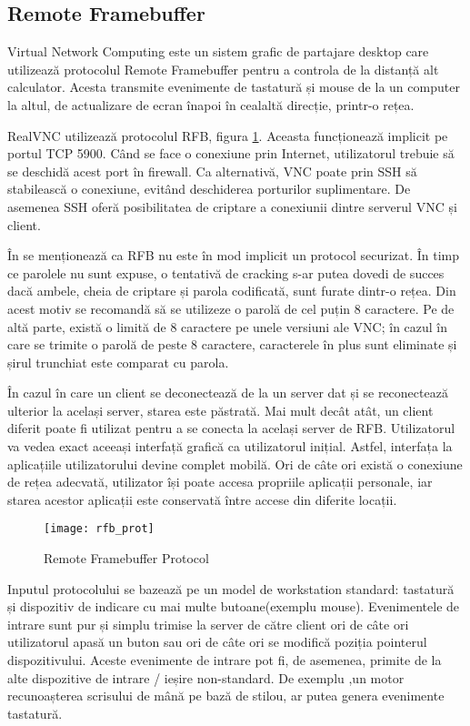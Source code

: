 \subsection{Remote Framebuffer}

Virtual Network Computing este un sistem grafic de partajare desktop care utilizează protocolul Remote Framebuffer pentru a controla de la distanță alt calculator. Acesta transmite  evenimente de tastatură și mouse de la un computer la altul, de actualizare de ecran înapoi în cealaltă direcție, printr-o rețea. 

RealVNC utilizează protocolul RFB, figura \ref{rfb-protocol}. Aceasta funcționează implicit pe portul TCP 5900. Când se face o conexiune prin Internet, utilizatorul trebuie să se deschidă acest port în firewall. Ca alternativă, VNC poate prin SSH  să stabilească o conexiune, evitând deschiderea porturilor suplimentare. De asemenea SSH oferă  posibilitatea de criptare a conexiunii dintre serverul VNC și client.

În \cite{wiki:vnc} se menționează ca RFB nu este în mod implicit un protocol securizat. În timp ce parolele nu sunt expuse, o tentativă de cracking s-ar putea dovedi de succes dacă ambele, cheia de criptare și parola codificată, sunt furate dintr-o rețea. Din acest motiv se recomandă să se utilizeze o parolă de cel puțin 8 caractere. Pe de altă parte, există o limită de 8 caractere pe unele versiuni ale VNC; în cazul în care se trimite o parolă de peste 8 caractere, caracterele în plus sunt eliminate și șirul trunchiat este comparat cu parola.

În cazul în care un client se deconectează de la un server dat și se reconectează ulterior la același server, starea este păstrată. Mai mult decât atât, un client diferit poate fi utilizat pentru a se conecta la același
server de RFB. Utilizatorul va vedea exact aceeași interfață grafică ca utilizatorul inițial. Astfel, interfața la aplicațiile utilizatorului devine complet mobilă. Ori de câte ori există o conexiune de rețea adecvată, utilizator își poate accesa propriile aplicații personale, iar starea acestor aplicații este
conservată între accese din diferite locații. 

\begin{figure}
    \centering
    \texttt{[image: rfb\_prot]}
    \caption{Remote Framebuffer Protocol}
    \label{rfb-protocol}
\end{figure}

Inputul protocolului se bazează pe un model de workstation standard: tastatură
și dispozitiv de indicare cu mai multe butoane(exemplu mouse). Evenimentele de intrare sunt pur și simplu trimise la server de către client ori de câte ori utilizatorul apasă un buton sau ori de câte ori se modifică poziția pointerul dispozitivului. Aceste evenimente de intrare pot fi, de asemenea, primite de la alte dispozitive de intrare / ieșire non-standard. De exemplu ,un motor recunoașterea scrisului de mână pe bază de stilou, ar putea genera evenimente tastatură.


